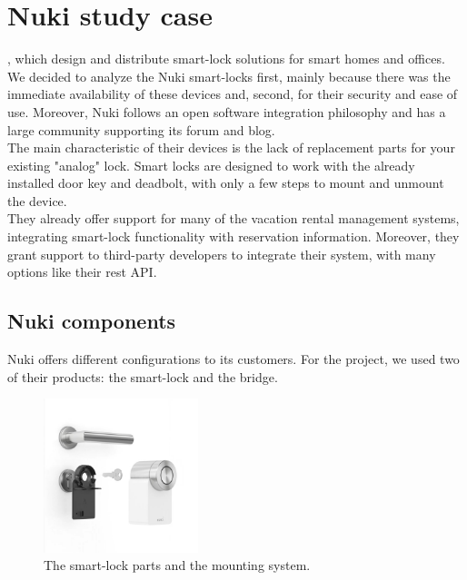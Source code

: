 
\chapter{Nuki study case}
\label{cap:three}

, which design and distribute smart-lock solutions for smart homes and offices. We decided to analyze the Nuki smart-locks first, mainly because there was the immediate availability of these devices and, second, for their security and ease of use. Moreover, Nuki follows an open software integration philosophy and has a large community supporting its forum and blog. 
\\ The main characteristic of their devices is the lack of replacement parts for your existing "analog" lock. Smart locks are designed to work with the already installed door key and deadbolt, with only a few steps to mount and unmount the device. 
\\ They already offer support for many of the vacation rental management systems, integrating smart-lock functionality with reservation information. Moreover, they grant support to third-party developers to integrate their system, with many options like their \acrshort{rest} API.

\section{Nuki components}
\label{sec:nukicomponents}
Nuki offers different configurations to its customers. For the project, we used two of their products: the smart-lock and the bridge. 

\begin{figure}
    \includegraphics[width=0.4\textwidth, frame]{figures/nuki-3-pro-lock.jpg}
    \caption{The smart-lock parts and the mounting system.}
    \label{fig:nuki-smart-lock}
\end{figure}

